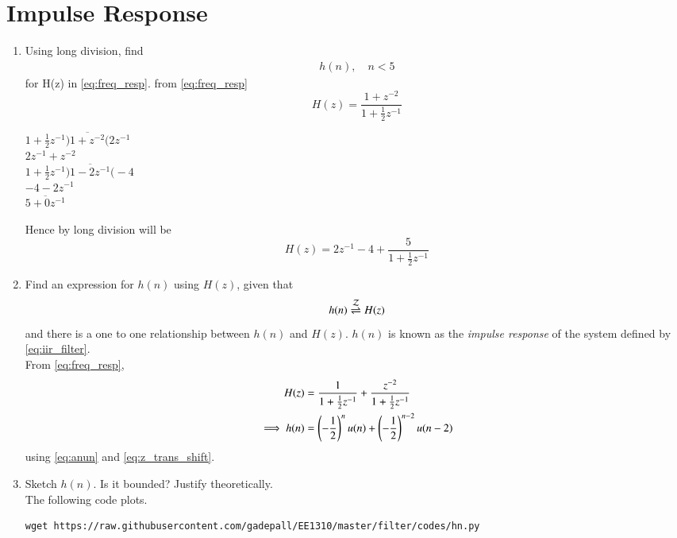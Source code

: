 \documentclass[journal,12pt,twocolumn]{IEEEtran}
\renewcommand\thesection{\arabic{section}}
\begin{document}
\section{Impulse Response}
\begin{enumerate}[label=\thesection.\arabic*]
	\item Using long division, 
find
		\begin{align}
			h(n), \quad n < 5
		\end{align}
		for H(z) in 
		\eqref{eq:freq_resp}.
\solution from \eqref{eq:freq_resp}
\begin{equation}
    H(z) = \frac{1 + z^{-2}}{1 + \frac{1}{2}z^{-1}}
\end{equation}
\begin{center}
    $1 + \frac{1}{2}z^{-1}\overline{)1 + z^{-2}(} 2z^{-1}$\\
    ${2z^{-1} + z^{-2}}$\\
    $1 + \frac{1}{2}z^{-1}\overline{)1-2z^{-1}(} -4$\\
    $-4 - 2z^{-1}$\\
    $\overline{5 + 0z^{-1}}$
\end{center}
Hence by long division will be 
\begin{equation}
    H(z) = 2z^{-1} -4 + \frac{5}{1 + \frac{1}{2}z^{-1}}
\end{equation}
\item \label{prob:impulse_resp}
Find an expression for $h(n)$ using $H(z)$, given that 
\begin{equation}
\label{eq:impulse_resp}
h(n) \overset{\mathcal{Z}}{ \rightleftharpoons} H(z)
\end{equation}
and there is a one to one relationship between $h(n)$ and $H(z)$. $h(n)$ is known as the {\em impulse response} of the
system defined by \eqref{eq:iir_filter}.
\\
\solution From \eqref{eq:freq_resp},
\begin{align}
H(z) &= \frac{1}{1 + \frac{1}{2}z^{-1}} + \frac{ z^{-2}}{1 + \frac{1}{2}z^{-1}}
\\
\implies h(n) &= \left(-\frac{1}{2}\right)^{n}u(n) + \left(-\frac{1}{2}\right)^{n-2}u(n-2)
\end{align}
using \eqref{eq:anun} and \eqref{eq:z_trans_shift}.
\item Sketch $h(n)$. Is it bounded? Justify theoretically.
\\
\solution The following code plots.
\begin{lstlisting}
wget https://raw.githubusercontent.com/gadepall/EE1310/master/filter/codes/hn.py

\end{lstlisting}
\end{enumerate}
\end{document}
